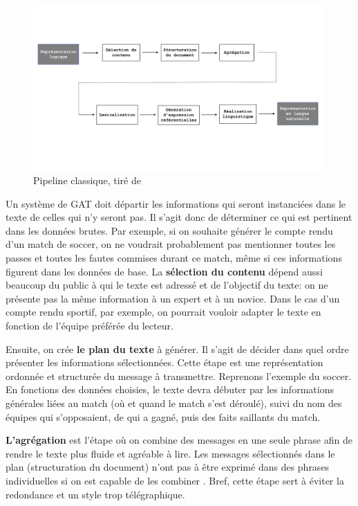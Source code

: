 \begin{figure}[htb] %
	\centering
	\includegraphics[width=1\textwidth, trim = {0cm 0cm 0cm 0cm},clip]{ch2/figs/pipeline.pdf}
	\caption{Pipeline classique, tiré de \citep{ReiterBuildingNaturalLanguage2000}}
	\label{fig:Pipeline}
\end{figure}

Un système de \ac{GAT} doit départir les informations qui seront instanciées dans le texte de celles qui n'y seront pas. Il s'agit donc de déterminer ce qui est pertinent dans les données brutes. Par exemple, si on souhaite générer le compte rendu d'un match de soccer, on ne voudrait probablement pas mentionner toutes les passes et toutes les fautes commises durant ce match, même si ces informations figurent dans les données de base. La \textbf{sélection du contenu} dépend aussi beaucoup du public à qui le texte est adressé et de l'objectif du texte: on ne présente pas la même information à un expert et à un novice. Dans le cas d'un compte rendu sportif, par exemple, on pourrait vouloir adapter le texte en fonction de l'équipe préférée du lecteur.

Ensuite, on crée \textbf{le plan du texte} à générer. Il s'agit de décider dans quel ordre présenter les informations sélectionnées. Cette étape est une représentation ordonnée et structurée du message à transmettre. Reprenons l'exemple du soccer. En fonctions des données choisies, le texte devra débuter par les informations générales liées au match (où et quand le match s'est déroulé), suivi du nom des équipes qui s'opposaient, de qui a gagné, puis des faits saillants du match.

\textbf{L'agrégation} est l'étape où on combine des messages en une seule phrase afin de rendre le texte plus fluide et agréable à lire. Les messages sélectionnés dans le plan (structuration du document) n'ont pas à être exprimé dans des phrases individuelles si on est capable de les combiner \citep{ChengCapturingInteractionAggregation2000}. Bref, cette étape sert à éviter la redondance et un style trop télégraphique.

